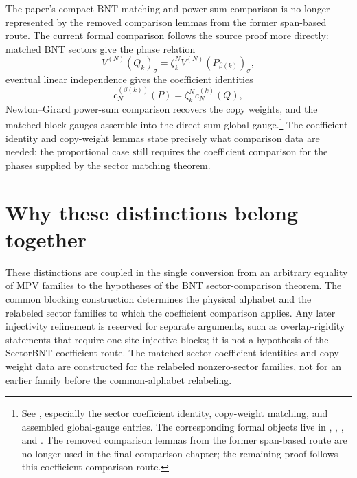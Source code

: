 \documentclass{article}
\begin{document}
The paper's compact BNT matching and power-sum comparison is no longer represented
by the removed comparison lemmas from the former span-based route. The
current formal comparison follows the source proof more directly: matched BNT
sectors give the phase relation
\[
  V^{(N)}(Q_k)_\sigma
    = \zeta_k^N V^{(N)}(P_{\beta(k)})_\sigma,
\]
eventual linear independence gives the coefficient identities
\[
  c_N^{(\beta(k))}(P)=\zeta_k^N c_N^{(k)}(Q),
\]
Newton--Girard power-sum comparison recovers the copy weights, and the matched
block gauges assemble into the direct-sum global gauge.\footnote{See
,
especially the sector coefficient identity, copy-weight matching, and assembled
global-gauge entries. The corresponding formal
objects live in
,
,
, and
.
The removed comparison lemmas from the former span-based route are no longer used
in the final comparison chapter; the remaining proof follows this
coefficient-comparison route.}
The coefficient-identity and copy-weight lemmas state precisely what comparison
data are needed; the proportional case still requires the coefficient comparison
for the phases supplied by the sector matching theorem.

\section{Why these distinctions belong together}

These distinctions are coupled in the single conversion from an arbitrary equality
of MPV families to the hypotheses of the BNT sector-comparison theorem. The
common blocking construction determines the physical alphabet and the relabeled
sector families to which the coefficient comparison applies. Any later injectivity
refinement is reserved for separate arguments, such as overlap-rigidity
statements that require one-site injective blocks; it is not a hypothesis of the
SectorBNT coefficient route. The matched-sector coefficient identities and
copy-weight data are constructed for the relabeled nonzero-sector families, not
for an earlier family before the common-alphabet relabeling.
\end{document}
